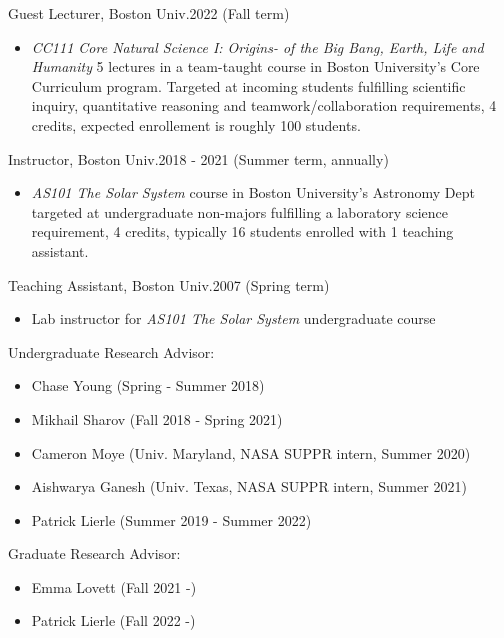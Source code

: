\documentclass[12pt]{report}
\begin{document}
\noindent Guest Lecturer, Boston Univ.\hfill 2022 (Fall term)
   \begin{itemize} \itemsep -2pt %
   \item \textit{CC111 Core Natural Science I: Origins- of the Big Bang, Earth, Life and Humanity} 5 lectures in a team-taught course in Boston University's Core Curriculum program. Targeted at incoming students fulfilling scientific inquiry, quantitative reasoning and teamwork/collaboration requirements, 4 credits, expected enrollement is roughly 100 students.
 \end{itemize}
\noindent Instructor, Boston Univ.\hfill 2018 - 2021 (Summer term, annually)
   \begin{itemize} \itemsep -2pt %
   \item \textit{AS101 The Solar System} course in Boston University's Astronomy Dept targeted at undergraduate
non-majors fulfilling a laboratory science requirement, 4 credits, typically 16 students enrolled with 1 teaching assistant.
 \end{itemize}
\noindent Teaching Assistant, Boston Univ.\hfill 2007 (Spring term)
   \begin{itemize} \itemsep -2pt %
   \item Lab instructor for \textit{AS101 The Solar System} undergraduate course
 \end{itemize}
\noindent Undergraduate Research Advisor: 
\begin{itemize} \itemsep -2pt 
	\item Chase Young (Spring - Summer 2018)
	\item Mikhail Sharov (Fall 2018 - Spring 2021)
	\item Cameron Moye (Univ. Maryland, NASA SUPPR intern, Summer 2020)
	\item Aishwarya Ganesh (Univ. Texas, NASA SUPPR intern, Summer 2021)
	\item Patrick Lierle (Summer 2019 - Summer 2022)
\end{itemize}
\noindent Graduate Research Advisor: 
\begin{itemize} \itemsep -2pt
	\item Emma Lovett (Fall 2021 -)
	\item Patrick Lierle (Fall 2022 -) 
\end{itemize}
\end{document}
